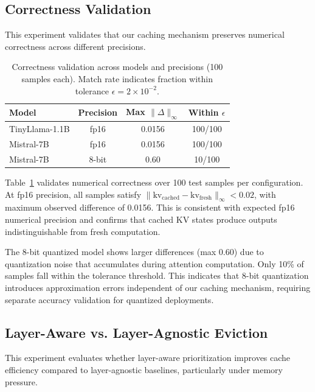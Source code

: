 \documentclass[10pt,conference]{IEEEtran}
\begin{document}
\subsection{Correctness Validation}

This experiment validates that our caching mechanism preserves numerical correctness across different precisions.

\begin{table}[t]
\centering
\caption{Correctness validation across models and precisions (100 samples each). Match rate indicates fraction within tolerance $\epsilon = 2\times10^{-2}$.}
\label{tab:correctness}
\begin{tabular}{lccc}
\toprule
Model & Precision & Max $\|\Delta\|_\infty$ & Within $\epsilon$ \\
\midrule
TinyLlama-1.1B & fp16 & 0.0156 & 100/100 \\
Mistral-7B & fp16 & 0.0156 & 100/100 \\
Mistral-7B & 8-bit & 0.60 & 10/100 \\
\bottomrule
\end{tabular}
\end{table}

Table~\ref{tab:correctness} validates numerical correctness over 100 test samples per configuration. At fp16 precision, all samples satisfy $\|\text{kv}_\text{cached} - \text{kv}_\text{fresh}\|_\infty < 0.02$, with maximum observed difference of 0.0156. This is consistent with expected fp16 numerical precision and confirms that cached KV states produce outputs indistinguishable from fresh computation.

The 8-bit quantized model shows larger differences (max 0.60) due to quantization noise that accumulates during attention computation. Only 10\% of samples fall within the tolerance threshold. This indicates that 8-bit quantization introduces approximation errors independent of our caching mechanism, requiring separate accuracy validation for quantized deployments.

\subsection{Layer-Aware vs. Layer-Agnostic Eviction}
\label{sec:eviction}

This experiment evaluates whether layer-aware prioritization improves cache efficiency compared to layer-agnostic baselines, particularly under memory pressure.
\end{document}
